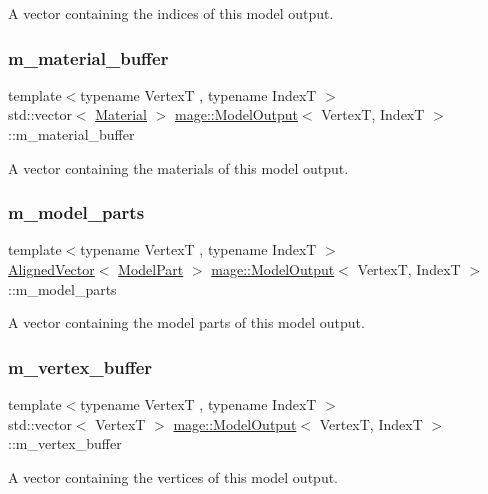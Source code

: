 A vector containing the indices of this model output. \hypertarget{structmage_1_1_model_output_a82e2a73de1adde3b4360f290078d0c7d}{}\label{structmage_1_1_model_output_a82e2a73de1adde3b4360f290078d0c7d} 
\subsubsection{\texorpdfstring{m\+\_\+material\+\_\+buffer}{m\_material\_buffer}}
{\footnotesize\ttfamily template$<$typename VertexT , typename IndexT $>$ \\
std\+::vector$<$ \hyperlink{classmage_1_1_material}{Material} $>$ \hyperlink{structmage_1_1_model_output}{mage\+::\+Model\+Output}$<$ VertexT, IndexT $>$\+::m\+\_\+material\+\_\+buffer}

A vector containing the materials of this model output. \hypertarget{structmage_1_1_model_output_aca7e45b0a0315459fd11b45face48544}{}\label{structmage_1_1_model_output_aca7e45b0a0315459fd11b45face48544} 
\subsubsection{\texorpdfstring{m\+\_\+model\+\_\+parts}{m\_model\_parts}}
{\footnotesize\ttfamily template$<$typename VertexT , typename IndexT $>$ \\
\hyperlink{namespacemage_a8664bfb5ce2179fc64eae9f82c8a5ba8}{Aligned\+Vector}$<$ \hyperlink{structmage_1_1_model_part}{Model\+Part} $>$ \hyperlink{structmage_1_1_model_output}{mage\+::\+Model\+Output}$<$ VertexT, IndexT $>$\+::m\+\_\+model\+\_\+parts}

A vector containing the model parts of this model output. \hypertarget{structmage_1_1_model_output_a93a22503c41a2c4a0f81f25d1d5317dd}{}\label{structmage_1_1_model_output_a93a22503c41a2c4a0f81f25d1d5317dd} 
\subsubsection{\texorpdfstring{m\+\_\+vertex\+\_\+buffer}{m\_vertex\_buffer}}
{\footnotesize\ttfamily template$<$typename VertexT , typename IndexT $>$ \\
std\+::vector$<$ VertexT $>$ \hyperlink{structmage_1_1_model_output}{mage\+::\+Model\+Output}$<$ VertexT, IndexT $>$\+::m\+\_\+vertex\+\_\+buffer}

A vector containing the vertices of this model output. 
